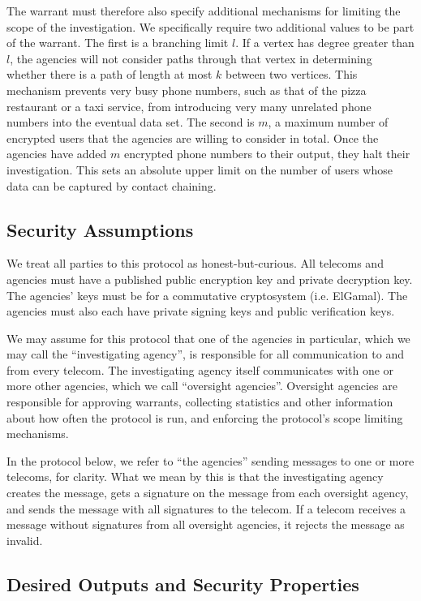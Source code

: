The warrant must therefore also specify additional mechanisms for limiting the scope of the investigation. We specifically require two additional values to be part of the warrant. The first is a branching limit $l$. If a vertex has degree greater than $l$, the agencies will not consider paths through that vertex in determining whether there is a path of length at most $k$ between two vertices. This mechanism prevents very busy phone numbers, such as that of the pizza restaurant or a taxi service, from introducing very many unrelated phone numbers into the eventual data set. The second is $m$, a maximum number of encrypted users that the agencies are willing to consider in total. Once the agencies have added $m$ encrypted phone numbers to their output, they halt their investigation. This sets an absolute upper limit on the number of users whose data can be captured by contact chaining.

\subsection{Security Assumptions}

We treat all parties to this protocol as honest-but-curious. All telecoms and agencies must have a published public encryption key and private decryption key. The agencies' keys must be for a commutative cryptosystem (i.e. ElGamal). The agencies must also each have private signing keys and public verification keys.

We may assume for this protocol that one of the agencies in particular, which we may call the ``investigating agency'', is responsible for all communication to and from every telecom. The investigating agency itself communicates with one or more other agencies, which we call ``oversight agencies''. Oversight agencies are responsible for approving warrants, collecting statistics and other information about how often the protocol is run, and enforcing the protocol's scope limiting mechanisms. 

In the protocol below, we refer to ``the agencies'' sending messages to one or more telecoms, for clarity. What we mean by this is that the investigating agency creates the message, gets a signature on the message from each oversight agency, and sends the message with all signatures to the telecom. If a telecom receives a message without signatures from all oversight agencies, it rejects the message as invalid.

\subsection{Desired Outputs and Security Properties}

